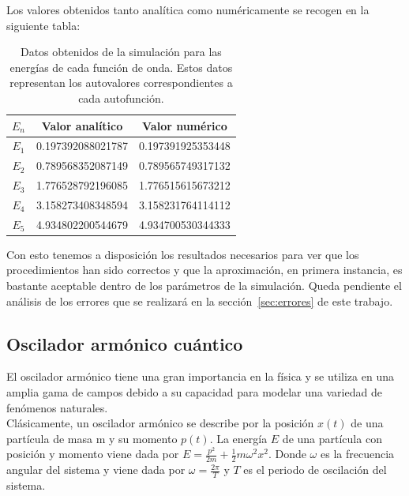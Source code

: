 \documentclass[12pt]{article}
\begin{document}
\newpage
Los valores obtenidos tanto analítica como numéricamente se recogen en la siguiente tabla:

\begin{table}[H]
    \centering
    \begin{tabular}{|c||c||c|}
    \hline
        $E_n$ & Valor analítico & Valor numérico \\ \hline \hline
        $E_1$ & 0.197392088021787 & 0.197391925353448 \\ \hline
        $E_2$ & 0.789568352087149 & 0.789565749317132 \\ \hline
        $E_3$ & 1.776528792196085 & 1.776515615673212 \\ \hline
        $E_4$ & 3.158273408348594 & 3.158231764114112 \\ \hline
        $E_5$ & 4.934802200544679 & 4.934700530344333 \\ \hline
    \end{tabular}
    \caption{Datos obtenidos de la simulación para las energías de cada función de onda. Estos datos representan los autovalores correspondientes a cada autofunción.}
\end{table}

Con esto tenemos a disposición los resultados necesarios para ver que los procedimientos han sido correctos y que la aproximación, en primera instancia, es bastante aceptable dentro de los parámetros de la simulación. Queda pendiente el análisis de los errores que se realizará en la sección~\ref{sec:errores} de este trabajo.

        \subsection{Oscilador armónico cuántico}

    El oscilador armónico tiene una gran importancia en la física 
    y se utiliza en una amplia gama de campos debido a su capacidad para modelar una variedad de fenómenos naturales.\\
    
    Clásicamente, un oscilador armónico se describe por la posición $x(t)$ de una partícula de masa m y su momento $p(t)$. La energía $E$ de una partícula con posición y momento viene dada por $E = \frac{p^2}{2m} + \frac{1}{2}m\omega^2x^2$.
    Donde $\omega$ es la frecuencia angular del sistema y viene dada por $\omega=\frac{2\pi}{T}$ y $T$ es el periodo de oscilación del sistema.\\
    
\end{document}
